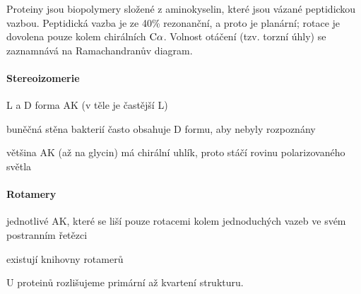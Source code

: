 \documentclass[DIV=8]{scrreprt}
\begin{document}
Proteiny jsou biopolymery složené z aminokyselin, které jsou vázané peptidickou vazbou. Peptidická vazba je ze 40\% rezonanční, a proto je planární; rotace je dovolena pouze kolem chirálních \(\ce{C\alpha}\). Volnost otáčení (tzv. torzní úhly) se zaznamnává na Ramachandranův diagram.

\paragraph{Stereoizomerie}
\begin{myItemize}[nosep]
    \item L a D forma AK (v těle je častější L)
\begin{myItemize}[nosep]
    \item buněčná stěna bakterií často obsahuje D formu, aby nebyly rozpoznány
\end{myItemize}

    \item většina AK (až na glycin) má chirální uhlík, proto stáčí rovinu polarizovaného světla
\end{myItemize}




\paragraph{Rotamery}
\begin{myItemize}[nosep]
    \item jednotlivé AK, které se liší pouze rotacemi kolem jednoduchých vazeb ve svém postranním řetězci
    \item existují knihovny rotamerů
\end{myItemize}



U proteinů rozlišujeme primární až kvartení strukturu.
\end{document}
